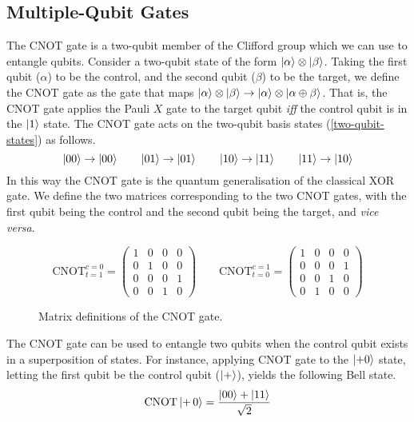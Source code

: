 \subsection{Multiple-Qubit Gates}

The CNOT gate is a two-qubit member of the Clifford group which we can use to entangle qubits. Consider a two-qubit state of the form $\ket \alpha \otimes \ket \beta$. Taking the first qubit ($\alpha$) to be the control, and the second qubit ($\beta$) to be the target, we define the CNOT gate as the gate that maps $\ket\alpha\otimes\ket\beta \rightarrow \ket\alpha\otimes\ket{\alpha\oplus\beta}$. That is, the CNOT gate applies the Pauli $X$ gate to the target qubit \textit{iff} the control qubit is in the $\ket 1$ state. The CNOT gate acts on the two-qubit basis states (\ref{two-qubit-states}) as follows.
\begin{equation*}
    \ket{00} \rightarrow \ket {00} \qquad
    \ket{01} \rightarrow \ket {01} \qquad
    \ket{10} \rightarrow \ket {11} \qquad
    \ket{11} \rightarrow \ket {10}
\end{equation*}
In this way the CNOT gate is the quantum generalisation of the classical XOR gate. We define the two matrices corresponding to the two CNOT gates, with the first qubit being the control and the second qubit being the target, and \textit{vice versa}.

\begin{figure}[H]
    \centering
    \begin{equation*}
    \text{CNOT}^{c=0}_{t=1} =
        \begin{pmatrix}
            1 & 0 & 0 & 0 \\
            0 & 1 & 0 & 0 \\
            0 & 0 & 0 & 1 \\
            0 & 0 & 1 & 0
        \end{pmatrix} \qquad
        \text{CNOT}^{c=1}_{t=0} =
        \begin{pmatrix}
            1 & 0 & 0 & 0 \\
            0 & 0 & 0 & 1 \\
            0 & 0 & 1 & 0 \\
            0 & 1 & 0 & 0
        \end{pmatrix}
    \end{equation*}
    \caption{Matrix definitions of the CNOT gate.}
    \label{cnot-definition}
\end{figure}

The CNOT gate can be used to entangle two qubits when the control qubit exists in a superposition of states. For instance, applying CNOT gate to the $\ket{+0}$ state, letting the first qubit be the control qubit ($\ket +$), yields the following Bell state.
\begin{equation*}
    \text{CNOT} \ket{+ \, 0} = \frac{\ket{00} + \ket{11}}{\sqrt 2}
\end{equation*}

